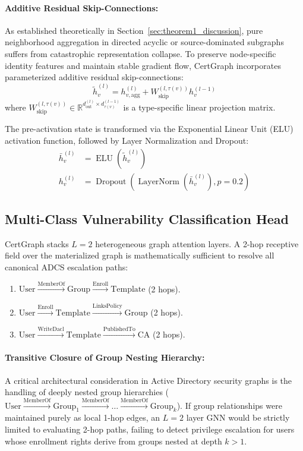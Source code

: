 \paragraph{Additive Residual Skip-Connections:}
As established theoretically in Section~\ref{sec:theorem1_discussion}, pure neighborhood aggregation in directed acyclic or source-dominated subgraphs suffers from catastrophic representation collapse. To preserve node-specific identity features and maintain stable gradient flow, CertGraph incorporates parameterized additive residual skip-connections:
\begin{equation}
\tilde{h}_v^{(l)} = h_{v, \text{agg}}^{(l)} + W_{\text{skip}}^{(l, \tau(v))} h_v^{(l-1)}
\end{equation}
where $W_{\text{skip}}^{(l, \tau(v))} \in \mathbb{R}^{d_{\text{out}}^{(l)} \times d_{\tau(v)}^{(l-1)}}$ is a type-specific linear projection matrix.

The pre-activation state is transformed via the Exponential Linear Unit (ELU) activation function, followed by Layer Normalization and Dropout:
\begin{align}
\bar{h}_v^{(l)} &= \operatorname{ELU} \left( \tilde{h}_v^{(l)} \right) \\
h_v^{(l)} &= \operatorname{Dropout} \left( \operatorname{LayerNorm} \left( \bar{h}_v^{(l)} \right), p = 0.2 \right)
\end{align}

\subsection{Multi-Class Vulnerability Classification Head}
CertGraph stacks $L = 2$ heterogeneous graph attention layers. A 2-hop receptive field over the materialized graph is mathematically sufficient to resolve all canonical ADCS escalation paths:
\begin{enumerate}
    \item $\text{User} \xrightarrow{\text{MemberOf}} \text{Group} \xrightarrow{\text{Enroll}} \text{Template}$ (2 hops).
    \item $\text{User} \xrightarrow{\text{Enroll}} \text{Template} \xrightarrow{\text{LinksPolicy}} \text{Group}$ (2 hops).
    \item $\text{User} \xrightarrow{\text{WriteDacl}} \text{Template} \xrightarrow{\text{PublishedTo}} \text{CA}$ (2 hops).
\end{enumerate}

\paragraph{Transitive Closure of Group Nesting Hierarchy:}
A critical architectural consideration in Active Directory security graphs is the handling of deeply nested group hierarchies ($\text{User} \xrightarrow{\text{MemberOf}} \text{Group}_1 \xrightarrow{\text{MemberOf}} \dots \xrightarrow{\text{MemberOf}} \text{Group}_k$). If group relationships were maintained purely as local 1-hop edges, an $L = 2$ layer GNN would be strictly limited to evaluating 2-hop paths, failing to detect privilege escalation for users whose enrollment rights derive from groups nested at depth $k > 1$. 

